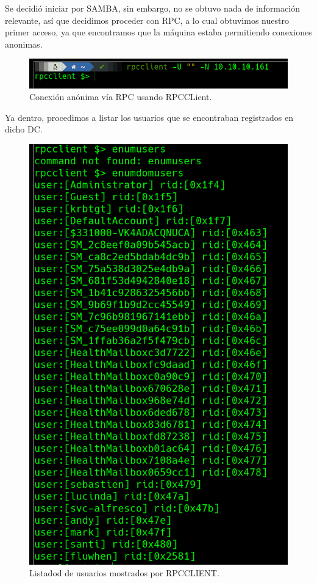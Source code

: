 \documentclass{article}
\begin{document}
Se decidió iniciar por SAMBA, sin embargo, no se obtuvo nada de información relevante, así que decidimos proceder con RPC, a lo cual obtuvimos nuestro primer acceso, ya que encontramos que la máquina estaba permitiendo conexiones anonimas.

\begin{figure}[H]
	\center
	\includegraphics[width=\textwidth/2]{images/forest/conexion_rpc.png}
	\caption{Conexión anónima vía RPC usando RPCCLient.}
\end{figure}

Ya dentro, procedimos a listar los usuarios que se encontraban registrados en dicho DC. 

\begin{figure}[H]
	\center
	\includegraphics[width=\textwidth/2]{images/forest/usuarios_rpc.png}
	\caption{Listadod de usuarios mostrados por RPCCLIENT.}
\end{figure}
\end{document}
